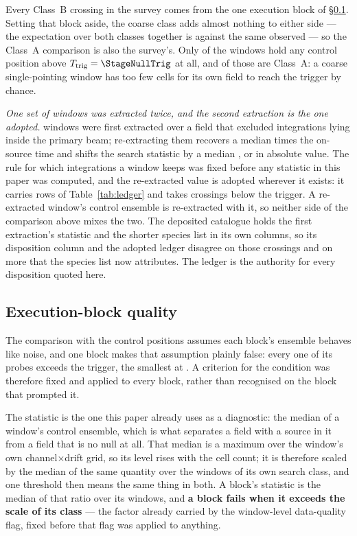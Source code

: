 Every Class~B crossing in the survey comes from the one execution block of
\S\ref{sec:blockquality}. Setting that block aside, the
coarse class adds almost nothing to either side --- the expectation over both
classes together is \StExpSurv{} against the same \StObs{} observed --- so
the Class~A comparison is also the survey's. Only \NCtrlWinObs{} of the
\NWindows{} windows hold any control position above
$T_{\rm trig}=\StageNullTrig$ at all, and \StageNullEligibleA{} of those are
Class~A: a coarse single-pointing window has too few cells for its own field
to reach the trigger by chance.

\emph{One set of windows was extracted twice, and the second extraction is
the one adopted.} \StNRep{} windows were first extracted over a field that
excluded integrations lying inside the primary beam; re-extracting them
recovers a median \StRepOnsrc{} times the on-source time and shifts the
search statistic by a median \StRepDT, or \StRepDTAbs{} in absolute value.
The rule for which integrations a window keeps was fixed before any statistic
in this paper was computed, and the re-extracted value is adopted wherever it
exists: it carries \StRepAdopted{} rows of Table~\ref{tab:ledger} and takes
\StRepFell{} crossings below the trigger. A re-extracted window's control
ensemble is re-extracted with it, so neither side of the comparison above
mixes the two. The deposited catalogue holds the
first extraction's statistic and the shorter species list in its own columns,
so its disposition column and the adopted ledger disagree on those
\StRepFell{} crossings and on \StRepAttr{} more that the species list now
attributes. The ledger is the authority for every disposition quoted here.

\subsection{Execution-block quality}
\label{sec:blockquality}

The comparison with the control positions assumes each block's ensemble
behaves like noise, and one block makes that assumption plainly false: every
one of its \NCtrl{} probes exceeds the trigger, the smallest at
\BqFailCtrlMin. A criterion for the condition was therefore fixed and applied
to every block, rather than recognised on the block that prompted it.

The statistic is the one this paper already uses as a diagnostic: the median
of a window's control ensemble, which is what separates a field with a source
in it from a field that is no null at all. That median is a maximum over the
window's own channel$\times$drift grid, so its level rises with the cell
count; it is therefore scaled by the median of the same quantity over the
windows of its own search class, and one threshold then means the same thing
in both. A block's statistic is the median of that ratio over its windows,
and \textbf{a block fails when it exceeds \BqFactor{} the scale of its
class} --- the factor already carried by the window-level data-quality flag,
fixed before that flag was applied to anything.

